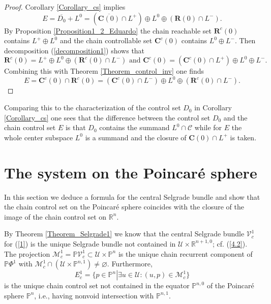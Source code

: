 \documentclass{siamltex}%
\begin{document}
\begin{proof}
Corollary \ref{Corollary_cs} implies%
\[
E=\overline{D_{0}}+L^{0}=\left(  \overline{\mathbf{C}(0)}\cap L^{+}\right)
\oplus L^{0}\oplus(\mathbf{R}(0)\cap L^{-}).
\]
By Proposition \ref{Proposition1_2_Eduardo} the chain reachable set
$\mathbf{R}^{c}(0)$ contains $L^{+}\oplus L^{0}$ and the chain controllable
set $\mathbf{C}^{c}(0)$ contains $L^{0}\oplus L^{-}$. Then decomposition
(\ref{decomposition1}) shows that%
\[
\mathbf{R}^{c}(0)=L^{+}\oplus L^{0}\oplus\left(  \mathbf{R}^{c}(0)\cap
L^{-}\right)  \text{ and }\mathbf{C}^{c}(0)=(\mathbf{C}^{c}(0)\cap
L^{+})\oplus L^{0}\oplus L^{-}.
\]
Combining this with Theorem \ref{Theorem_control_inv} one finds%
\[
E=\mathbf{C}^{c}(0)\cap\mathbf{R}^{c}(0)=(\mathbf{C}^{c}(0)\cap L^{-})\oplus
L^{0}\oplus(\mathbf{R}^{c}(0)\cap L^{-}).
\]

\end{proof}

Comparing this to the characterization of the control set $D_{0}$ in Corollary
\ref{Corollary_cs} one sees that the difference between the control set
$D_{0}$ and the chain control set $E$ is that $D_{0}$ contains the summand
$L^{0}\cap\mathcal{C}$ while for $E$ the whole center subspace $L^{0}$ is a
summand and the closure of $\mathbf{C}(0)\cap L^{+}$ is taken.

\section{The system on the Poincar\'{e} sphere\label{Section5}}

In this section we deduce a formula for the central Selgrade bundle and show
that the chain control set on the Poincar\'{e} sphere coincides with the
closure of the image of the chain control set on $\mathbb{R}^{n}$.

By Theorem \ref{Theorem_Selgrade1} we know that the central Selgrade bundle
$\mathcal{V}_{c}^{1}$ for (\ref{1}) is the unique Selgrade bundle not
contained in $\mathcal{U}\times\mathbb{R}^{n+1,0}$; cf. (\ref{4.2}). The
projection $\mathcal{M}_{c}^{1}=\mathbb{P}\mathcal{V}_{c}^{1}\subset
\mathcal{U}\times\mathbb{P}^{n}$ is the unique chain recurrent component of
$\mathbb{P}\Phi^{1}$ with $\mathcal{M}_{c}^{1}\cap\left(  \mathcal{U}%
\times\mathbb{P}^{n,1}\right)  \not =\varnothing$. Furthermore,
\[
E_{c}^{1}=\{p\in\mathbb{P}^{n}\left\vert \exists u\in\mathcal{U}%
:(u,p)\in\mathcal{M}_{c}^{1}\right.  \}
\]
is the unique chain control set not contained in the equator $\mathbb{P}%
^{n,0}$ of the Poincar\'{e} sphere $\mathbb{P}^{n}$, i.e., having nonvoid
intersection with $\mathbb{P}^{n,1}$.
\end{document}
